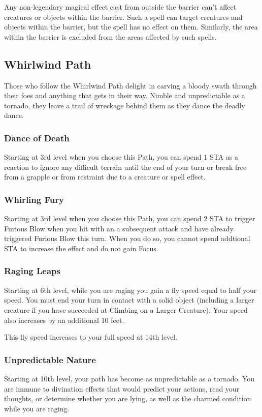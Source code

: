 Any non-legendary magical effect cast from outside the barrier can't affect creatures or objects within the barrier. Such a spell can target creatures and objects within the barrier, but the spell has no effect on them. Similarly, the area within the barrier is excluded from the areas affected by such spells.

\subsection{Whirlwind Path}
Those who follow the Whirlwind Path delight in carving a bloody swath through their foes and anything that gets in their way. Nimble and unpredictable as a tornado, they leave a trail of wreckage behind them as they dance the deadly dance.

\subsubsection{Dance of Death}
Starting at 3rd level when you choose this Path, you can spend 1 STA as a reaction to ignore any difficult terrain until the end of your turn or break free from a grapple or from restraint due to a creature or spell effect.

\subsubsection{Whirling Fury}
Starting at 3rd level when you choose this Path, you can spend 2 STA to trigger Furious Blow when you hit with an a subsequent attack and have already triggered Furious Blow this turn. When you do so, you cannot spend addtional STA to increase the effect and do not gain Focus.

\subsubsection{Raging Leaps}
Starting at 6th level, while you are raging you gain a fly speed equal to half your speed. You must end your turn in contact with a solid object (including a larger creature if you have succeeded at Climbing on a Larger Creature). Your speed also increases by an additional 10 feet.

This fly speed increases to your full speed at 14th level.

\subsubsection{Unpredictable Nature}
Starting at 10th level, your path has become as unpredictable as a tornado. You are immune to divination effects that would predict your actions, read your thoughts, or determine whether you are lying, as well as the charmed condition while you are raging.

